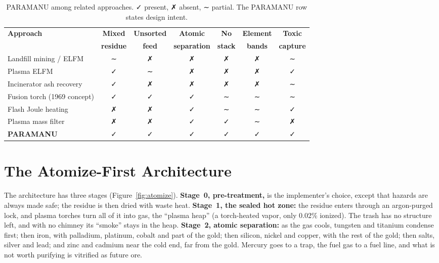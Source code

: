 \documentclass[11pt,a4paper]{article}
\theoremstyle{definition}
\theoremstyle{plain}
\theoremstyle{remark}
\begin{document}
\begin{table}[!htbp]
\centering
\caption{PARAMANU among related approaches. ✓ present, ✗ absent, ∼ partial. The PARAMANU row states design intent.}\label{tab:prior}
\footnotesize\setlength{\tabcolsep}{4.5pt}
\begin{tabular}{@{}lcccccc@{}}
\toprule
\textbf{Approach} & \textbf{Mixed} & \textbf{Unsorted} & \textbf{Atomic} & \textbf{No} & \textbf{Element} & \textbf{Toxic} \\
 & \textbf{residue} & \textbf{feed} & \textbf{separation} & \textbf{stack} & \textbf{bands} & \textbf{capture} \\
\midrule
Landfill mining / ELFM & ∼ & ✗ & ✗ & ✗ & ✗ & ∼ \\
Plasma ELFM & ✓ & ∼ & ✗ & ✗ & ✗ & ✓ \\
Incinerator ash recovery & ✓ & ✗ & ✗ & ✗ & ✗ & ∼ \\
Fusion torch (1969 concept) & ✓ & ✓ & ✓ & ∼ & ∼ & ∼ \\
Flash Joule heating & ✗ & ✗ & ✓ & ∼ & ∼ & ✓ \\
Plasma mass filter & ✗ & ✗ & ✓ & ✓ & ∼ & ✗ \\
\textbf{PARAMANU} & ✓ & ✓ & ✓ & ✓ & ✓ & ✓ \\
\bottomrule
\end{tabular}
\end{table}

\section{The Atomize-First Architecture}\label{sec:arch}

The architecture has three stages (Figure~\ref{fig:atomize}). \textbf{Stage~0, pre-treatment,} is the implementer's choice, except that hazards are always made safe; the residue is then dried with waste heat. \textbf{Stage~1, the sealed hot zone:} the residue enters through an argon-purged lock, and plasma torches turn all of it into gas, the ``plasma heap'' (a torch-heated vapor, only 0.02\% ionized). The trash has no structure left, and with no chimney its ``smoke'' stays in the heap. \textbf{Stage~2, atomic separation:} as the gas cools, tungsten and titanium condense first; then iron, with palladium, platinum, cobalt and part of the gold; then silicon, nickel and copper, with the rest of the gold; then salts, silver and lead; and zinc and cadmium near the cold end, far from the gold. Mercury goes to a trap, the fuel gas to a fuel line, and what is not worth purifying is vitrified as future ore.
\end{document}
